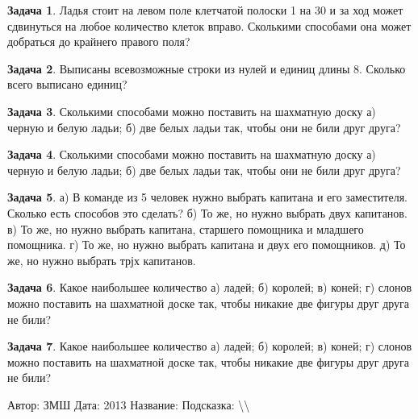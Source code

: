 \documentclass[a4paper,11pt]{article}%
\theoremstyle{definition}%
\newtheorem{Ex}{\hspace{-25pt}\fbox{\phantom{123}} Задача}%
\begin{document}
\begin{Ex}%
Ладья стоит на левом поле клетчатой полоски 1 на 30 и за ход может сдвинуться на любое количество
клеток вправо. Сколькими способами она может добраться до крайнего правого поля?%
%
\end{Ex}%
%
\iffalse%
Автор: ЗМШ%
Дата: 2013%
Название: %
Подсказка: \textbackslash{}\textbackslash{}%
nan%
\fi%
%
\begin{Ex}%
Выписаны всевозможные строки из нулей и единиц длины 8. Сколько всего выписано единиц?%
%
\end{Ex}%
%
\iffalse%
Автор: ЗМШ%
Дата: 2013%
Название: %
Подсказка: \textbackslash{}\textbackslash{}%
nan%
\fi%
%
\begin{Ex}%
Сколькими способами можно поставить на шахматную доску
а) черную и белую ладьи; б) две белых ладьи так, чтобы они не били друг друга?%
%
\end{Ex}%
%
\iffalse%
Автор: ЗМШ%
Дата: 2013%
Название: %
Подсказка: \textbackslash{}\textbackslash{}%
nan%
\fi%
%
\begin{Ex}%
Сколькими способами можно поставить на шахматную доску
а) черную и белую ладьи; б) две белых ладьи так, чтобы они не били друг друга?%
%
\end{Ex}%
%
\iffalse%
Автор: ЗМШ%
Дата: 2013%
Название: %
Подсказка: \textbackslash{}\textbackslash{}%
nan%
\fi%
%
\begin{Ex}%
а) В команде из 5 человек нужно выбрать капитана и его заместителя. Сколько есть способов это
сделать?
б) То же, но нужно выбрать двух капитанов.
в) То же, но нужно выбрать капитана, старшего помощника и младшего помощника.
г) То же, но нужно выбрать капитана и двух его помощников.
д) То же, но нужно выбрать трјх капитанов.%
%
\end{Ex}%
%
\iffalse%
Автор: ЗМШ%
Дата: 2013%
Название: %
Подсказка: \textbackslash{}\textbackslash{}%
nan%
\fi%
%
\begin{Ex}%
Какое наибольшее количество а) ладей; б) королей; в) коней; г) слонов можно поставить на шахматной доске так, чтобы никакие две фигуры друг друга не били?%
%
\end{Ex}%
%
\iffalse%
Автор: ЗМШ%
Дата: 2013%
Название: %
Подсказка: \textbackslash{}\textbackslash{}%
nan%
\fi%
%
\begin{Ex}%
Какое наибольшее количество а) ладей; б) королей; в) коней; г) слонов можно поставить на шахматной доске так, чтобы никакие две фигуры друг друга не били?%
%
\end{Ex}%
%
\iffalse%
Автор: ЗМШ%
Дата: 2013%
Название: %
Подсказка: \textbackslash{}\textbackslash{}%
\end{document}
